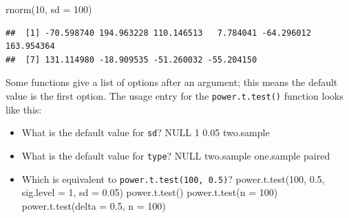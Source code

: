 \documentclass[
  oneside]{book}
\newenvironment{Shaded}{\begin{snugshade}}{\end{snugshade}}
\newcommand{\AttributeTok}[1]{\textcolor[rgb]{0.77,0.63,0.00}{#1}}
\newcommand{\ConstantTok}[1]{\textcolor[rgb]{0.00,0.00,0.00}{#1}}
\newcommand{\DecValTok}[1]{\textcolor[rgb]{0.00,0.00,0.81}{#1}}
\newcommand{\FloatTok}[1]{\textcolor[rgb]{0.00,0.00,0.81}{#1}}
\newcommand{\FunctionTok}[1]{\textcolor[rgb]{0.00,0.00,0.00}{#1}}
\newcommand{\NormalTok}[1]{#1}
\newcommand{\SpecialCharTok}[1]{\textcolor[rgb]{0.00,0.00,0.00}{#1}}
\newcommand{\StringTok}[1]{\textcolor[rgb]{0.31,0.60,0.02}{#1}}
\providecommand{\tightlist}{%
  \setlength{\itemsep}{0pt}\setlength{\parskip}{0pt}}
\begin{document}
\begin{Shaded}
\begin{Highlighting}[]
\FunctionTok{rnorm}\NormalTok{(}\DecValTok{10}\NormalTok{, }\AttributeTok{sd =} \DecValTok{100}\NormalTok{)}
\end{Highlighting}
\end{Shaded}

\begin{verbatim}
##  [1] -70.598740 194.963228 110.146513   7.784041 -64.296012 163.954364
##  [7] 131.114980 -18.909535 -51.260032 -55.204150
\end{verbatim}

Some functions give a list of options after an argument; this means the default value is the first option. The usage entry for the \texttt{power.t.test()} function looks like this:

\begin{Shaded}
\end{Shaded}

\begin{try}

\begin{itemize}
\tightlist
\item
  What is the default value for \texttt{sd}? NULL 1 0.05 two.sample
\item
  What is the default value for \texttt{type}? NULL two.sample one.sample paired
\item
  Which is equivalent to \texttt{power.t.test(100,\ 0.5)}? power.t.test(100, 0.5, sig.level = 1, sd = 0.05) power.t.test() power.t.test(n = 100) power.t.test(delta = 0.5, n = 100)
\end{itemize}

\end{try}
\end{document}
